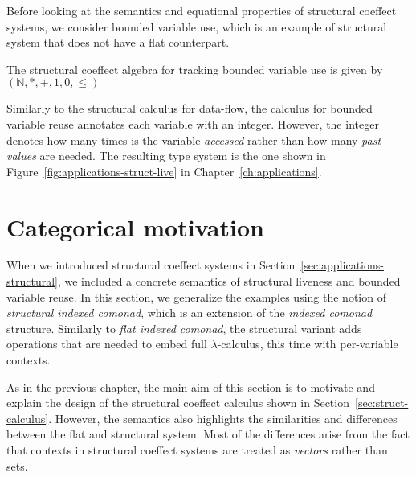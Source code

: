Before looking at the semantics and equational properties of structural coeffect systems, 
we consider bounded variable use, which is an example of structural system that does not
have a flat counterpart.

\begin{example}
The structural coeffect algebra for tracking bounded variable use is given by
$(\mathbb{N}, \ast, +, 1, 0, \leq)$
\end{example}

\noindent
Similarly to the structural calculus for data-flow, the calculus for bounded variable reuse
annotates each variable with an integer. However, the integer denotes how many times is the variable 
\emph{accessed} rather than how many \emph{past values} are needed. The resulting type system is 
the one shown in Figure~\ref{fig:applications-struct-live} in Chapter~\ref{ch:applications}.

%                                              

\section{Categorical motivation}
\label{sec:struct-semantics}

When we introduced structural coeffect systems in Section~\ref{sec:applications-structural}, we 
included a concrete semantics of structural liveness and bounded variable reuse. In this section,
we generalize the examples using the notion of \emph{structural indexed comonad}, which is an 
extension of the \emph{indexed comonad} structure. Similarly to \emph{flat indexed comonad}, the
structural variant adds operations that are needed to embed full $\lambda$-calculus, this time 
with per-variable contexts.

As in the previous chapter, the main aim of this section is to motivate and explain the design of 
the structural coeffect calculus shown in Section~\ref{sec:struct-calculus}. However, the semantics 
also highlights the similarities and differences between the flat and structural system.
Most of the differences arise from the fact that contexts in structural coeffect systems are treated 
as \emph{vectors} rather than sets. 

